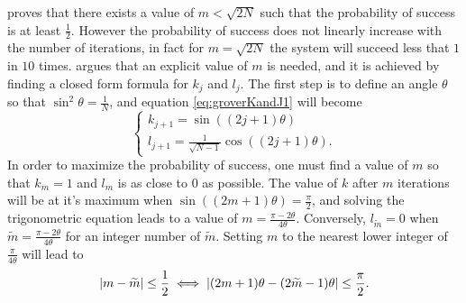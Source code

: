 \documentclass[../../dissertation.tex]{subfiles}
\begin{document}
\cite{grover1996} proves that there exists a value of $m < \sqrt{2N}$ such that
the probability of success is at least $\frac{1}{2}$. However the probability
of success does not linearly increase with the number of iterations, in fact
for $m=\sqrt{2N}$ the system will succeed less that $1$ in $10$ times.
\cite{boyer1996} argues that an explicit value of $m$ is needed, and it is
achieved by finding a closed form formula for $k_j$ and $l_j$. The first step
is to define an angle $\theta$ so that $\sin^2\theta = \frac{1}{N}$, and
equation \ref{eq:groverKandJ1} will become
\begin{equation}
	\begin{cases}
		k_{j+1} = \sin{((2j+1)\theta)} 
		\\l_{j+1} = \frac{1}{\sqrt{N-1}}\cos{((2j+1)\theta)}.
	\end{cases}\label{eq:groverKandJ2}
\end{equation}
In order to maximize the probability of success, one must find a value of $m$
so that $k_m = 1$ and $l_m$ is as close to $0$ as possible. The value of $k$
after $m$ iterations will be at it's maximum when $\sin{((2m+1)\theta)} =
\frac{\pi}{2}$, and solving the trigonometric equation leads to a value of $m =
\frac{\pi-2\theta}{4\theta}$. Conversely, $l_{\widetilde{m}} = 0$ when
$\widetilde{m} = \frac{\pi-2\theta}{4\theta}$ for an integer number of
$\widetilde{m}$. Setting $m$ to the nearest lower integer of
$\frac{\pi}{4\theta}$ will lead to
\begin{equation}
	\abs{m-\widetilde{m}} \leq \frac{1}{2} \iff \abs{(2m+1)\theta - (2\widetilde{m}-1)\theta} \leq \frac{\pi}{2}.
\end{equation}
\end{document}
